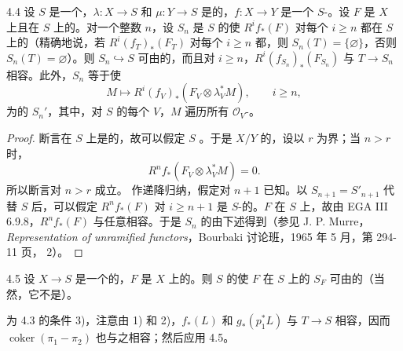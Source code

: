 \begin{SGAresult}{}{4.4}
设 $S$ 是一个，$\lambda:X\to S$ 和 $\mu:Y\to S$ 是的，$f:X\to Y$ 是一个 $S$-。设 $F$ 是 $X$ 上且在 $S$ 上的。对一个整数 $n$，设 $S_n$ 是 $S$ 的使 $R^if_*(F)$ 对每个 $i\geq n$ 都在 $S$ 上的（精确地说，若 $R^i(f_T)_*(F_T)$ 对每个 $i\geq n$ 都，则 $S_n(T)=\{\varnothing\}$，否则 $S_n(T)=\varnothing$）。则 $S_n\hookrightarrow S$ 可由的，而且对 $i\geq n$，$R^i(f_{S_n})_*(F_{S_n})$ 与 $T\to S_n$ 相容。此外，$S_n$ 等于使
\[
M\longmapsto R^i(f_V)_*(F_V\otimes\lambda_V^*M),\qquad i\geq n,
\]
为的 $S_n'$，其中，对 $S$ 的每个 $V$，$M$ 遍历所有 $\mathcal O_V$-。
\end{SGAresult}
\begin{proof}
断言在 $S$ 上是的，故可以假定 $S$ 。于是 $X/Y$ 的，设以 $r$ 为界；当 $n>r$ 时，
\[
R^nf_*(F_V\otimes\lambda_V^*M)=0.
\]
所以断言对 $n>r$ 成立。
作递降归纳，假定对 $n+1$ 已知。以 $S_{n+1}=S'_{n+1}$ 代替 $S$ 后，可以假定 $R^nf_*(F)$ 对 $i\geq n+1$ 是 $S$-的。$F$ 在 $S$ 上，故由 EGA III 6.9.8，$R^nf_*(F)$ 与任意相容。于是 $S_n$ 的由下述得到（参见 J. P. Murre，\emph{Representation of unramified functors}，Bourbaki 讨论班，1965 年 5 月，第 294-11 页， 2）。
\end{proof}

\begin{SGAresult}{}{4.5}
设 $X\to S$ 是一个的，$F$ 是 $X$ 上的。则 $S$ 的使 $F$ 在 $S$ 上的 $S_F$ 可由的（当然，它不是）。
\end{SGAresult}
为 4.3 的条件 3)，注意由 1) 和 2)，$f_*(L)$ 和 $g_*(p_1^*L)$ 与 $T\to S$ 相容，因而 $\operatorname{coker}(\pi_1-\pi_2)$ 也与之相容；然后应用 4.5。

